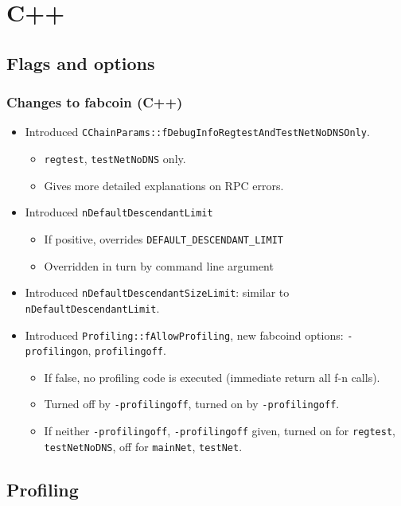 \section{C++}
\subsection{Flags and options}
\begin{frame}[fragile]
\frametitle{Changes to fabcoin (C++)}
\begin{itemize}
\item Introduced \verb|CChainParams::fDebugInfoRegtestAndTestNetNoDNSOnly|.
\begin{itemize}
\item \verb|regtest|, \verb|testNetNoDNS| only.
\item Gives more detailed explanations on RPC errors.
\end{itemize}
\item Introduced  \verb|nDefaultDescendantLimit|
\begin{itemize}
	\item If positive, overrides \verb|DEFAULT_DESCENDANT_LIMIT|
	\item Overridden in turn by command line argument 
	
\end{itemize}
\item Introduced \verb|nDefaultDescendantSizeLimit|: similar to  \verb|nDefaultDescendantLimit|.

\item Introduced \verb|Profiling::fAllowProfiling|, new fabcoind options: \verb|-profilingon|, \verb|profilingoff|. 
\begin{itemize}
	\item If false, no profiling code is executed (immediate return all f-n calls).
	\item Turned off by \verb|-profilingoff|, turned on by \verb|-profilingoff|.
	\item If neither \verb|-profilingoff|, \verb|-profilingoff| given, turned on for \verb|regtest|, \verb|testNetNoDNS|,
	off for \verb|mainNet|, \verb|testNet|.
\end{itemize}

\end{itemize}

\end{frame}

\subsection{Profiling}


